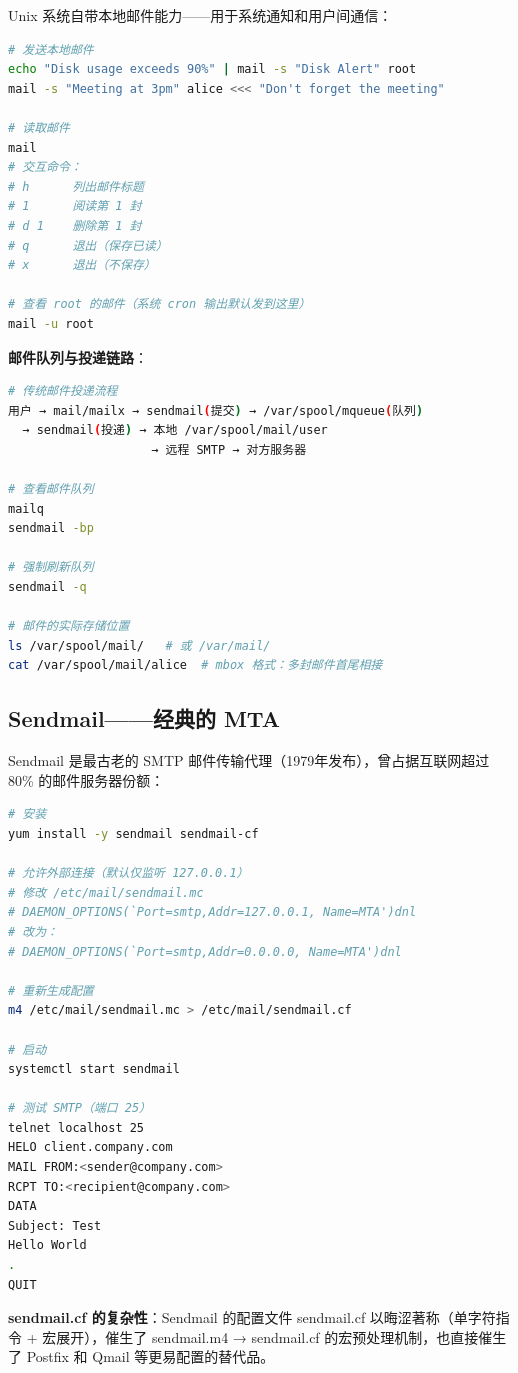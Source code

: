 \documentclass[12pt,UTF8]{ctexbook}
\begin{document}
Unix 系统自带本地邮件能力——用于系统通知和用户间通信：

\begin{lstlisting}[language=bash]
# 发送本地邮件
echo "Disk usage exceeds 90%" | mail -s "Disk Alert" root
mail -s "Meeting at 3pm" alice <<< "Don't forget the meeting"

# 读取邮件
mail
# 交互命令：
# h      列出邮件标题
# 1      阅读第 1 封
# d 1    删除第 1 封
# q      退出（保存已读）
# x      退出（不保存）

# 查看 root 的邮件（系统 cron 输出默认发到这里）
mail -u root
\end{lstlisting}

\textbf{邮件队列与投递链路}：
\begin{lstlisting}[language=bash]
# 传统邮件投递流程
用户 → mail/mailx → sendmail(提交) → /var/spool/mqueue(队列)
  → sendmail(投递) → 本地 /var/spool/mail/user
                    → 远程 SMTP → 对方服务器

# 查看邮件队列
mailq
sendmail -bp

# 强制刷新队列
sendmail -q

# 邮件的实际存储位置
ls /var/spool/mail/   # 或 /var/mail/
cat /var/spool/mail/alice  # mbox 格式：多封邮件首尾相接
\end{lstlisting}

\subsection{Sendmail——经典的 MTA}

Sendmail 是最古老的 SMTP 邮件传输代理（1979年发布），曾占据互联网超过 80\% 的邮件服务器份额：

\begin{lstlisting}[language=bash]
# 安装
yum install -y sendmail sendmail-cf

# 允许外部连接（默认仅监听 127.0.0.1）
# 修改 /etc/mail/sendmail.mc
# DAEMON_OPTIONS(`Port=smtp,Addr=127.0.0.1, Name=MTA')dnl
# 改为：
# DAEMON_OPTIONS(`Port=smtp,Addr=0.0.0.0, Name=MTA')dnl

# 重新生成配置
m4 /etc/mail/sendmail.mc > /etc/mail/sendmail.cf

# 启动
systemctl start sendmail

# 测试 SMTP（端口 25）
telnet localhost 25
HELO client.company.com
MAIL FROM:<sender@company.com>
RCPT TO:<recipient@company.com>
DATA
Subject: Test
Hello World
.
QUIT
\end{lstlisting}

\textbf{sendmail.cf 的复杂性}：Sendmail 的配置文件 sendmail.cf 以晦涩著称（单字符指令 + 宏展开），催生了 sendmail.m4 → sendmail.cf 的宏预处理机制，也直接催生了 Postfix 和 Qmail 等更易配置的替代品。
\end{document}
